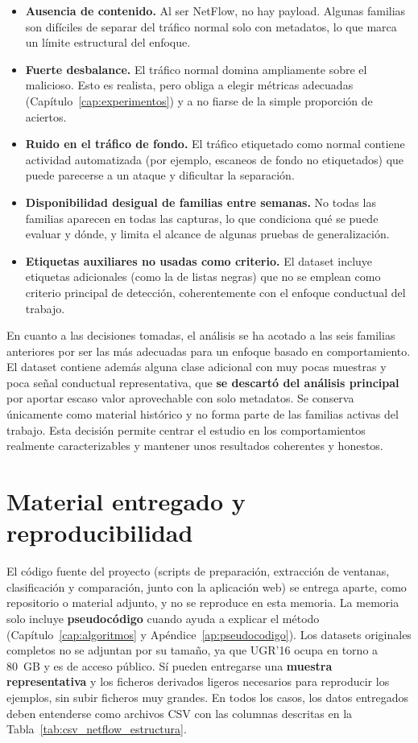 \begin{itemize}
  \item \textbf{Ausencia de contenido.} Al ser NetFlow, no hay payload. Algunas familias son difíciles de separar del tráfico normal solo con metadatos, lo que marca un límite estructural del enfoque.
  \item \textbf{Fuerte desbalance.} El tráfico normal domina ampliamente sobre el malicioso. Esto es realista, pero obliga a elegir métricas adecuadas (Capítulo~\ref{cap:experimentos}) y a no fiarse de la simple proporción de aciertos.
  \item \textbf{Ruido en el tráfico de fondo.} El tráfico etiquetado como normal contiene actividad automatizada (por ejemplo, escaneos de fondo no etiquetados) que puede parecerse a un ataque y dificultar la separación.
  \item \textbf{Disponibilidad desigual de familias entre semanas.} No todas las familias aparecen en todas las capturas, lo que condiciona qué se puede evaluar y dónde, y limita el alcance de algunas pruebas de generalización.
  \item \textbf{Etiquetas auxiliares no usadas como criterio.} El dataset incluye etiquetas adicionales (como la de listas negras) que no se emplean como criterio principal de detección, coherentemente con el enfoque conductual del trabajo.
\end{itemize}

En cuanto a las decisiones tomadas, el análisis se ha acotado a las seis familias anteriores por ser las más adecuadas para un enfoque basado en comportamiento. El dataset contiene además alguna clase adicional con muy pocas muestras y poca señal conductual representativa, que \textbf{se descartó del análisis principal} por aportar escaso valor aprovechable con solo metadatos. Se conserva únicamente como material histórico y no forma parte de las familias activas del trabajo. Esta decisión permite centrar el estudio en los comportamientos realmente caracterizables y mantener unos resultados coherentes y honestos.

\section{Material entregado y reproducibilidad}
\label{sec:herr_entrega}

El código fuente del proyecto (scripts de preparación, extracción de ventanas, clasificación y comparación, junto con la aplicación web) se entrega aparte, como repositorio o material adjunto, y no se reproduce en esta memoria. La memoria solo incluye \textbf{pseudocódigo} cuando ayuda a explicar el método (Capítulo~\ref{cap:algoritmos} y Apéndice~\ref{ap:pseudocodigo}). Los datasets originales completos no se adjuntan por su tamaño, ya que UGR'16 ocupa en torno a 80~GB y es de acceso público. Sí pueden entregarse una \textbf{muestra representativa} y los ficheros derivados ligeros necesarios para reproducir los ejemplos, sin subir ficheros muy grandes. En todos los casos, los datos entregados deben entenderse como archivos CSV con las columnas descritas en la Tabla~\ref{tab:csv_netflow_estructura}.
